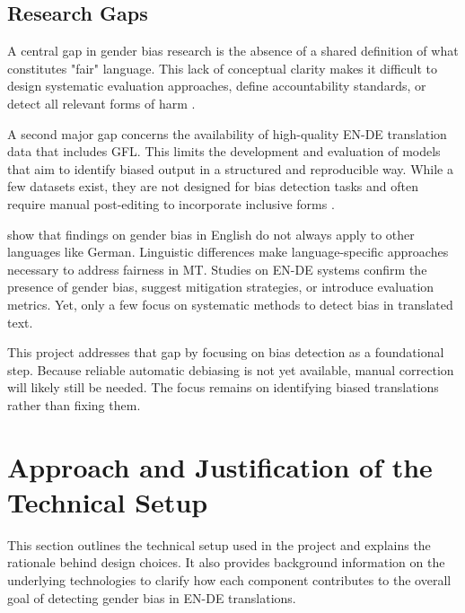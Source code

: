 
    \subsection{Research Gaps}
    A central gap in gender bias research is the absence of a shared definition of what constitutes "fair" language. This lack of conceptual clarity makes it difficult to design systematic evaluation approaches, define accountability standards, or detect all relevant forms of harm \parencite{barclayInvestigatingMarkersDrivers2024a,shresthaExploringGenderBiases2022,stanczakSurveyGenderBias2021}.

    A second major gap concerns the availability of high-quality EN-DE translation data that includes GFL. This limits the development and evaluation of models that aim to identify biased output in a structured and reproducible way. While a few datasets exist, they are not designed for bias detection tasks and often require manual post-editing to incorporate inclusive forms \parencite{lardelliBuildingBridgesDataset2024}.

    \textcite{stanczakSurveyGenderBias2021} show that findings on gender bias in English do not always apply to other languages like German. Linguistic differences make language-specific approaches necessary to address fairness in MT. Studies on EN-DE systems \parencite{ullmannGenderBiasMachine2022,kapplAreAllSpanish2025,lardelliBuildingBridgesDataset2024} confirm the presence of gender bias, suggest mitigation strategies, or introduce evaluation metrics. Yet, only a few focus on systematic methods to detect bias in translated text.

   This project addresses that gap by focusing on bias detection as a foundational step. Because reliable automatic debiasing is not yet available, manual correction will likely still be needed. The focus remains on identifying biased translations rather than fixing them.


\section{Approach and Justification of the Technical Setup}
    This section outlines the technical setup used in the project and explains the rationale behind design choices. It also provides background information on the underlying technologies to clarify how each component contributes to the overall goal of detecting gender bias in EN-DE translations.

